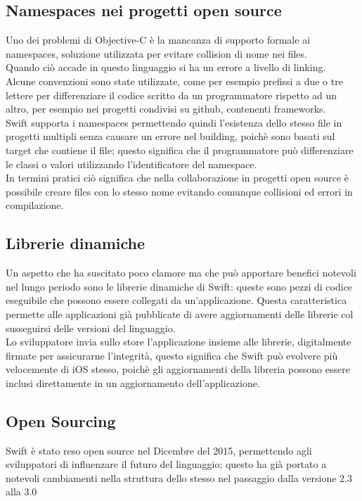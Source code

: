 \subsection{Namespaces nei progetti open source}
Uno dei problemi di Objective-C è la mancanza di supporto formale ai namespaces, soluzione utilizzata per evitare collision di nome nei files.\\Quando ciò accade in questo linguaggio si ha un errore a livello di linking.\\Alcune convenzioni sono state utilizzate, come per esempio prefissi a due o tre lettere per differenziare il codice scritto da un programmatore rispetto ad un altro, per esempio nei progetti condivisi su github, contenenti frameworks.\\
Swift supporta i namespaces permettendo quindi l'esistenza dello stesso file in progetti multipli senza causare un errore nel building, poichè sono basati sul target che contiene il file; questo significa che il programmatore può differenziare le classi o valori utilizzando l'identificatore del namespace.\\
In termini pratici ciò significa che nella collaborazione in progetti open source è possibile creare files con lo stesso nome evitando comunque collisioni ed errori in compilazione.\\
\subsection{Librerie dinamiche}
Un aspetto che ha suscitato poco clamore ma che può apportare benefici notevoli nel lungo periodo sono le librerie dinamiche di Swift: queste sono pezzi di codice eseguibile che possono essere collegati da un'applicazione. Questa caratteristica permette alle applicazioni già pubblicate di avere aggiornamenti delle librerie col susseguirsi delle versioni del linguaggio.\\Lo sviluppatore invia sullo store l'applicazione insieme alle librerie, digitalmente firmate per assicurarne l'integrità, questo significa che Swift può evolvere più velocemente di iOS stesso, poichè gli aggiornamenti della libreria possono essere inclusi direttamente in un aggiornamento dell'applicazione.\\
\subsection{Open Sourcing}
Swift è stato reso open source nel Dicembre del 2015, permettendo agli sviluppatori di influenzare il futuro del linguaggio; questo ha già portato a notevoli cambiamenti nella struttura dello stesso nel passaggio dalla versione 2.3 alla 3.0  

